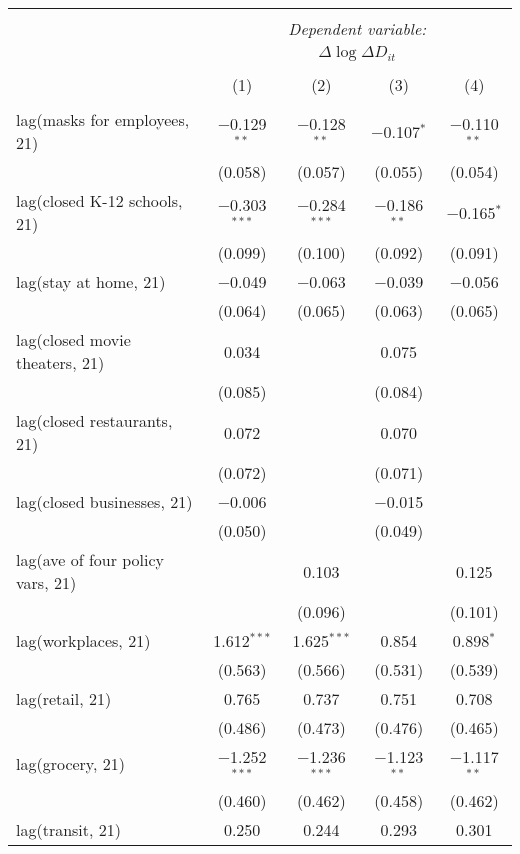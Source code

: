 \begin{tabular}{@{\extracolsep{1pt}}lcccc} 
\\[-1.8ex]\hline 
\hline \\[-1.8ex] 
 & \multicolumn{4}{c}{\textit{Dependent variable:}} \\ 
\cline{2-5} 
 & \multicolumn{4}{c}{$\Delta \log \Delta D_{it}$} \\ 
\\[-1.8ex] & (1) & (2) & (3) & (4)\\ 
\hline \\[-1.8ex] 
 lag(masks for employees, 21) & $-$0.129$^{**}$ & $-$0.128$^{**}$ & $-$0.107$^{*}$ & $-$0.110$^{**}$ \\ 
  & (0.058) & (0.057) & (0.055) & (0.054) \\ 
  lag(closed K-12 schools, 21) & $-$0.303$^{***}$ & $-$0.284$^{***}$ & $-$0.186$^{**}$ & $-$0.165$^{*}$ \\ 
  & (0.099) & (0.100) & (0.092) & (0.091) \\ 
  lag(stay at home, 21) & $-$0.049 & $-$0.063 & $-$0.039 & $-$0.056 \\ 
  & (0.064) & (0.065) & (0.063) & (0.065) \\ 
  lag(closed movie theaters, 21) & 0.034 &  & 0.075 &  \\ 
  & (0.085) &  & (0.084) &  \\ 
  lag(closed restaurants, 21) & 0.072 &  & 0.070 &  \\ 
  & (0.072) &  & (0.071) &  \\ 
  lag(closed businesses, 21) & $-$0.006 &  & $-$0.015 &  \\ 
  & (0.050) &  & (0.049) &  \\ 
  lag(ave of four policy vars, 21) &  & 0.103 &  & 0.125 \\ 
  &  & (0.096) &  & (0.101) \\ 
  lag(workplaces, 21) & 1.612$^{***}$ & 1.625$^{***}$ & 0.854 & 0.898$^{*}$ \\ 
  & (0.563) & (0.566) & (0.531) & (0.539) \\ 
  lag(retail, 21) & 0.765 & 0.737 & 0.751 & 0.708 \\ 
  & (0.486) & (0.473) & (0.476) & (0.465) \\ 
  lag(grocery, 21) & $-$1.252$^{***}$ & $-$1.236$^{***}$ & $-$1.123$^{**}$ & $-$1.117$^{**}$ \\ 
  & (0.460) & (0.462) & (0.458) & (0.462) \\ 
  lag(transit, 21) & 0.250 & 0.244 & 0.293 & 0.301 \\ 

\end{tabular}
